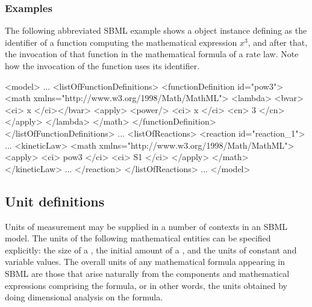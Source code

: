 \subsubsection{Examples}

The following abbreviated SBML example shows a \FunctionDefinition
object instance defining  as the identifier of a function
computing the mathematical expression $x^{3}$, and after that, the
invocation of that function in the mathematical formula of a rate
law.  Note how the invocation of the function uses its identifier.

\begin{example}
<model>
    ...
    <listOfFunctionDefinitions>
        <functionDefinition id="pow3">
            <math xmlns="http://www.w3.org/1998/Math/MathML">
                <lambda>
                    <bvar><ci> x </ci></bvar>
                    <apply>
                        <power/>
                        <ci> x </ci>
                        <cn> 3 </cn>
                    </apply>
                </lambda>
            </math>
        </functionDefinition>
    </listOfFunctionDefinitions>
    ...
    <listOfReactions>
        <reaction id="reaction_1">
            ...
            <kineticLaw>
                <math xmlns="http://www.w3.org/1998/Math/MathML">
                    <apply>
                        <ci> pow3 </ci>
                        <ci> S1 </ci>
                     </apply>
                </math>
            </kineticLaw>
            ...
        </reaction>
    </listOfReactions>
    ...
</model>\end{example}


\subsection{Unit definitions}
\label{sec:unitdefinitions}

Units of measurement may be supplied in a number of contexts in an
SBML model.  The units of the following
  mathematical entities can be specified explicitly: the size of a
  \Compartment, the initial amount of a \Species, and
  the units of constant and variable \Parameter values.  The
  overall units of any mathematical formula appearing in
  SBML are those that arise naturally from the components and
  mathematical expressions comprising the formula, or in
  other words, the units obtained by doing dimensional analysis on
  the formula.

